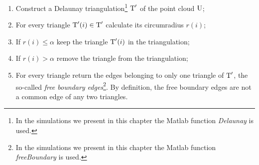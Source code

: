 \begin{enumerate}
\item Construct a Delaunay triangulation\footnote{In the simulations we present in this chapter the Matlab function \textit{Delaunay} is used.} $\mbox{$\textup{T}$}^\prime$ of the point cloud $\mbox{$\textup{U}$}$;
\item For every triangle $\mbox{$\textup{T}$}^\prime(i)\in \mbox{$\textup{T}$}^\prime$ calculate its circumradius $r(i)$;
\item If $r(i)\leq\alpha$ keep the triangle $\mbox{$\textup{T}$}^\prime(i)$ in the triangulation;
\item If $r(i)>\alpha$ remove the triangle from the triangulation;
\item For every triangle return the edges belonging to only one triangle of $\mbox{$\textup{T}$}^{\prime}$, the so-called \textit{free boundary edges}\footnote{In the simulations we present in this chapter the Matlab function \textit{freeBoundary} is used.}. By definition, the free boundary edges are not a common edge of any two triangles.
\end{enumerate}
